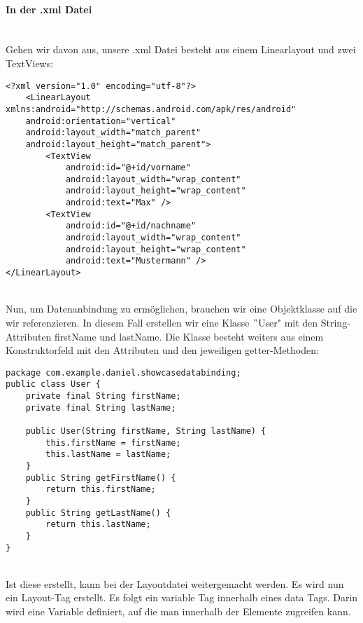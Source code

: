\documentclass[FIPLY_base.tex]{subfiles}
\begin{document}
\paragraph{In der .xml Datei}
\ \\
Gehen wir davon aus, unsere .xml Datei besteht aus einem Linearlayout und zwei TextViews:

\begin{lstlisting}[caption={Layoutcode ohne jedliche Datenanbindung.},label=DescriptiveLabel]
<?xml version="1.0" encoding="utf-8"?>
	<LinearLayout xmlns:android="http://schemas.android.com/apk/res/android"
	android:orientation="vertical"
	android:layout_width="match_parent"
	android:layout_height="match_parent">
		<TextView
			android:id="@+id/vorname"
			android:layout_width="wrap_content"
			android:layout_height="wrap_content"
			android:text="Max" />
		<TextView
			android:id="@+id/nachname"
			android:layout_width="wrap_content"
			android:layout_height="wrap_content"
			android:text="Mustermann" />
</LinearLayout>

\end{lstlisting}
\ \\
Nun, um Datenanbindung zu ermöglichen, brauchen wir eine Objektklasse auf die wir referenzieren. In diesem Fall erstellen wir eine Klasse $"$User" mit den String-Attributen firstName und lastName. Die Klasse besteht weiters aus einem Konstruktorfeld mit den Attributen und den jeweiligen getter-Methoden: 

\begin{lstlisting}[caption={Unsere Objektklasse die bei der Datenanbindung referenziert wird.},label=DescriptiveLabel]
package com.example.daniel.showcasedatabinding;
public class User {
    private final String firstName;
    private final String lastName;

    public User(String firstName, String lastName) {
        this.firstName = firstName;
        this.lastName = lastName;
    }
    public String getFirstName() {
        return this.firstName;
    }
    public String getLastName() {
        return this.lastName;
    }
}
\end{lstlisting}
\ \\
Ist diese erstellt, kann bei der Layoutdatei weitergemacht werden. Es wird nun ein Layout-Tag erstellt. Es folgt ein variable Tag innerhalb eines data Tags. Darin wird eine Variable definiert, auf die man innerhalb der Elemente zugreifen kann.
\end{document}
